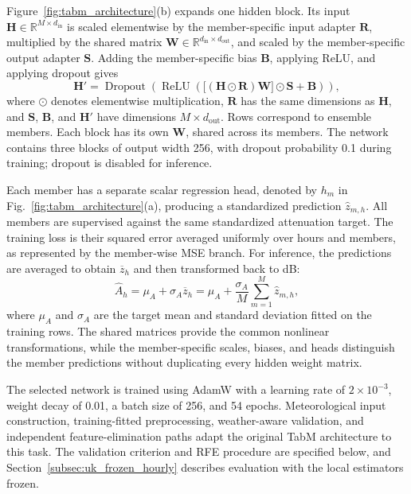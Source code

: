 Figure~\ref{fig:tabm_architecture}(b) expands one hidden block. Its input $\mathbf{H}\in\mathbb{R}^{M\times d_{\mathrm{in}}}$ is scaled elementwise by the member-specific input adapter $\mathbf{R}$, multiplied by the shared matrix $\mathbf{W}\in\mathbb{R}^{d_{\mathrm{in}}\times d_{\mathrm{out}}}$, and scaled by the member-specific output adapter $\mathbf{S}$. Adding the member-specific bias $\mathbf{B}$, applying ReLU, and applying dropout gives
\begin{equation}
\mathbf{H}'=
\operatorname{Dropout}\!\left(
\operatorname{ReLU}\!\left(
\bigl[(\mathbf{H}\odot\mathbf{R})\mathbf{W}\bigr]\odot\mathbf{S}
+\mathbf{B}
\right)\right),
\label{eq:tabm_hidden_block}
\end{equation}
where $\odot$ denotes elementwise multiplication, $\mathbf{R}$ has the same dimensions as $\mathbf{H}$, and $\mathbf{S}$, $\mathbf{B}$, and $\mathbf{H}'$ have dimensions $M\times d_{\mathrm{out}}$. Rows correspond to ensemble members. Each block has its own $\mathbf{W}$, shared across its members. The network contains three blocks of output width 256, with dropout probability 0.1 during training; dropout is disabled for inference.

Each member has a separate scalar regression head, denoted by $h_m$ in Fig.~\ref{fig:tabm_architecture}(a), producing a standardized prediction $\widehat{z}_{m,h}$. All members are supervised against the same standardized attenuation target. The training loss is their squared error averaged uniformly over hours and members, as represented by the member-wise MSE branch. For inference, the predictions are averaged to obtain $\overline{z}_h$ and then transformed back to dB:
\begin{equation}
\widehat{A}_h
=\mu_A+\sigma_A\overline{z}_h
=\mu_A+\frac{\sigma_A}{M}\sum_{m=1}^{M}\widehat{z}_{m,h},
\label{eq:tabm_hourly_estimate}
\end{equation}
where $\mu_A$ and $\sigma_A$ are the target mean and standard deviation fitted on the training rows. The shared matrices provide the common nonlinear transformations, while the member-specific scales, biases, and heads distinguish the member predictions without duplicating every hidden weight matrix.

The selected network is trained using AdamW with a learning rate of $2\times10^{-3}$, weight decay of 0.01, a batch size of 256, and 54 epochs. Meteorological input construction, training-fitted preprocessing, weather-aware validation, and independent feature-elimination paths adapt the original TabM architecture to this task. The validation criterion and RFE procedure are specified below, and Section~\ref{subsec:uk_frozen_hourly} describes evaluation with the local estimators frozen.

